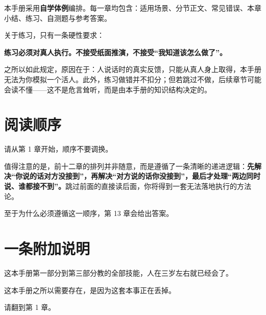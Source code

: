 本手册采用\textbf{自学体例}编排。每一章均包含：适用场景、分节正文、常见错误、本章小结、练习、自测题与参考答案。

关于练习，只有一条硬性要求：

\begin{mdquote}
\textbf{练习必须对真人执行。不接受纸面推演，不接受“我知道该怎么做了”。}
\end{mdquote}

之所以如此规定，原因在于：人说话时的真实反馈，只能从真人身上取得，本手册无法为你模拟一个活人。此外，练习做错并不扣分；但若跳过不做，后续章节可能会读不懂——这不是危言耸听，而是由本手册的知识结构决定的。

\section{阅读顺序}

请从第 1 章开始，顺序不要调换。

值得注意的是，前十二章的排列并非随意，而是遵循了一条清晰的递进逻辑：\textbf{先解决“你说的话对方没接到”，再解决“对方说的话你没接到”，最后才处理“两边同时说、谁都接不到”。}跳过前面的直接读后面，你将得到一套无法落地执行的方法论。

至于为什么必须遵循这一顺序，第 13 章会给出答案。

\section{一条附加说明}

这本手册第一部分到第三部分教的全部技能，人在三岁左右就已经会了。

这本手册之所以需要存在，是因为这套本事正在丢掉。

请翻到第 1 章。
